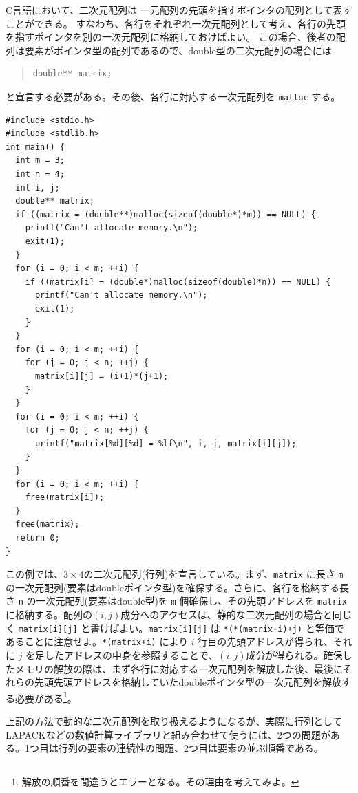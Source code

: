 C言語において、二次元配列は 一元配列の先頭を指すポインタの配列として表すことができる。
すなわち、各行をそれぞれ一次元配列として考え、各行の先頭を指すポインタを別の一次元配列に格納しておけばよい。
この場合、後者の配列は要素がポインタ型の配列であるので、double型の二次元配列の場合には
\begin{quote}
\begin{verbatim}
double** matrix;
\end{verbatim}
\end{quote}
と宣言する必要がある。その後、各行に対応する一次元配列を \verb|malloc| する。
\begin{reidai}\label{ex:malloc-2dim}
\begin{verbatim}
#include <stdio.h>
#include <stdlib.h>
int main() {
  int m = 3;
  int n = 4;
  int i, j;
  double** matrix;
  if ((matrix = (double**)malloc(sizeof(double*)*m)) == NULL) {
    printf("Can't allocate memory.\n");
    exit(1);
  }
  for (i = 0; i < m; ++i) {
    if ((matrix[i] = (double*)malloc(sizeof(double)*n)) == NULL) {
      printf("Can't allocate memory.\n");
      exit(1);
    }
  }
  for (i = 0; i < m; ++i) {
    for (j = 0; j < n; ++j) {
      matrix[i][j] = (i+1)*(j+1);
    }
  }
  for (i = 0; i < m; ++i) {
    for (j = 0; j < n; ++j) {
      printf("matrix[%d][%d] = %lf\n", i, j, matrix[i][j]);
    }
  }
  for (i = 0; i < m; ++i) {
    free(matrix[i]);
  }
  free(matrix);
  return 0;
}
\end{verbatim}
\end{reidai} \noindent
この例では、$3 \times 4$の二次元配列(行列)を宣言している。まず、\verb|matrix| に長さ \verb|m| の一次元配列(要素はdoubleポインタ型)を確保する。さらに、各行を格納する長さ \verb|n| の一次元配列(要素はdouble型)を \verb|m| 個確保し、その先頭アドレスを \verb|matrix| に格納する。配列の$(i,j)$成分へのアクセスは、静的な二次元配列の場合と同じく \verb|matrix[i][j]| と書けばよい。\verb|matrix[i][j]| は \verb|*(*(matrix+i)+j)| と等価であることに注意せよ。\verb|*(matrix+i)| により $i$ 行目の先頭アドレスが得られ、それに $j$ を足したアドレスの中身を参照することで、$(i,j)$成分が得られる。確保したメモリの解放の際は、まず各行に対応する一次元配列を解放した後、最後にそれらの先頭先頭アドレスを格納していたdoubleポインタ型の一次元配列を解放する必要がある\footnote{解放の順番を間違うとエラーとなる。その理由を考えてみよ。}。

上記の方法で動的な二次元配列を取り扱えるようになるが、実際に行列としてLAPACKなどの数値計算ライブラリと組み合わせて使うには、2つの問題がある。1つ目は行列の要素の連続性の問題、2つ目は要素の並ぶ順番である。

